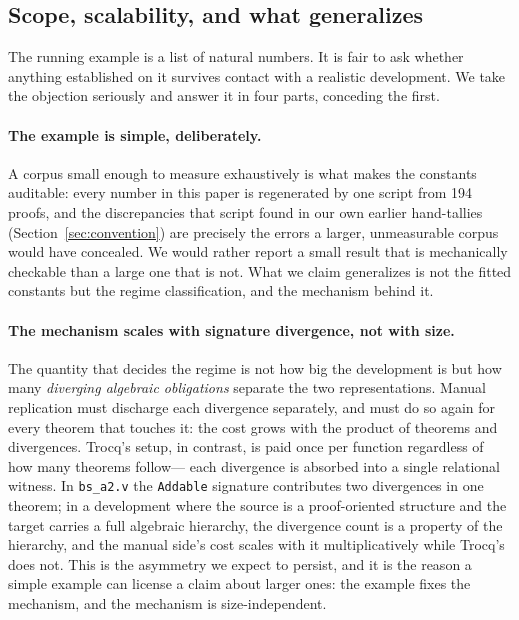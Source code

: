 \documentclass[runningheads]{llncs}
\begin{document}
\subsection{Scope, scalability, and what generalizes}
\label{sec:scope}

The running example is a list of natural numbers. It is fair to ask whether
anything established on it survives contact with a realistic development. We
take the objection seriously and answer it in four parts, conceding the first.

\paragraph{The example is simple, deliberately.} A corpus small enough to
measure exhaustively is what makes the constants auditable: every number in
this paper is regenerated by one script from 194 proofs, and the discrepancies
that script found in our own earlier hand-tallies
(Section~\ref{sec:convention}) are precisely the errors a larger, unmeasurable
corpus would have concealed. We would rather report a small result that is
mechanically checkable than a large one that is not. What we claim
generalizes is not the fitted constants but the regime classification, and
the mechanism behind it.

\paragraph{The mechanism scales with signature divergence, not with size.}
The quantity that decides the regime is not how big the development is but
how many \emph{diverging algebraic obligations} separate the two
representations. Manual replication must discharge each divergence
separately, and must do so again for every theorem that touches it: the cost
grows with the product of theorems and divergences. Trocq's setup, in
contrast, is paid once per function regardless of how many theorems follow---%
each divergence is absorbed into a single relational witness. In
\texttt{bs\_a2.v} the \texttt{Addable} signature contributes two divergences
in one theorem; in a development where the source is a proof-oriented
structure and the target carries a full algebraic hierarchy, the divergence
count is a property of the hierarchy, and the manual side's cost scales with
it multiplicatively while Trocq's does not. This is the asymmetry we expect
to persist, and it is the reason a simple example can license a claim about
larger ones: the example fixes the mechanism, and the mechanism is
size-independent.
\end{document}
